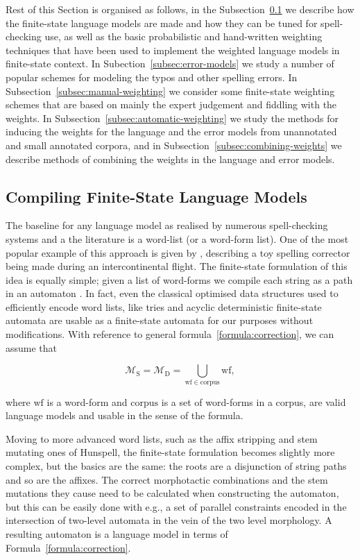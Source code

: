 \documentclass[a4paper,12pt]{article}
\begin{document}
Rest of this Section is organised as follows, in the
Subsection~\ref{subsec:language-models} we describe how the finite-state
language models are made and how they can be tuned for spell-checking use, as
well as the basic probabilistic and hand-written weighting techniques that have
been used to implement the weighted language models in finite-state context. In
Subection~\ref{subsec:error-models} we study a number of popular schemes for
modeling the typos and other spelling errors.  In
Subsection~\ref{subsec:manual-weighting} we consider some finite-state
weighting schemes that are based on mainly the expert judgement and fiddling
with the weights.  In Subsection~\ref{subsec:automatic-weighting} we study the
methods for inducing the weights for the language and the error models from
unannotated and small annotated corpora, and in
Subsection~\ref{subsec:combining-weights} we describe methods of combining the
weights in the language and error models.

\subsection{Compiling Finite-State Language Models}
\label{subsec:language-models}

The baseline for any language model as realised by numerous spell-checking
systems and a the literature is a word-list (or a word-form list). One of the
most popular example of this approach is given by \cite{norvig/2010},
describing a toy spelling corrector being made during an intercontinental
flight. The finite-state formulation of this idea is equally simple; given a
list of word-forms we compile each string as a path in an automaton
\cite[]{pirinen2012effects}. In fact, even the classical optimised data
structures used to efficiently encode word lists, like tries and acyclic
deterministic finite-state automata are usable as a finite-state automata for
our purposes without modifications. With reference to general
formula~\ref{formula:correction}, we can assume that

\begin{equation}
    \mathcal{M}_\mathrm{S} = \mathcal{M}_\mathrm{D} = \bigcup_{\mathrm{wf} \in \mathrm{corpus}} \mathrm{wf},
\end{equation}

where $\mathrm{wf}$ is a word-form and $\mathrm{corpus}$ is a set of word-forms
in a corpus, are valid language models and usable in the sense of the formula.

Moving to more advanced word lists, such as the affix stripping and stem
mutating ones of Hunspell, the finite-state formulation becomes slightly more
complex, but the basics are the same: the roots are a disjunction of string
paths and so are the affixes. The correct morphotactic combinations and the
stem mutations they cause need to be calculated when constructing the
automaton, but this can be easily done with e.g., a set of parallel constraints
encoded in the intersection of two-level automata \cite[]{pirinen2010creating}
in the vein of the two level morphology. A resulting automaton is a language
model in terms of Formula~\ref{formula:correction}.
\end{document}
